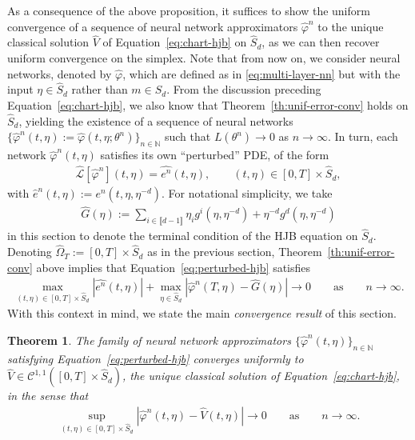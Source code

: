 \documentclass[11pt,reqno]{amsart}
\numberwithin{equation}{section}
\theoremstyle{plain}
\newtheorem{theorem}{Theorem}[section]
\newcommand{\sC}{\mathcal{C}}
\newcommand{\sL}{\mathcal{L}}
\newcommand{\N}{\mathbb{N}}
\newcommand{\lbrs}[1]{\llbracket #1 \rrbracket}
\begin{document}
As a consequence of the above proposition, it suffices to show the uniform convergence of a sequence of neural network approximators $\widehat{\varphi}^n$ to the unique classical solution $\widehat{V}$ of Equation~\eqref{eq:chart-hjb} on $\widehat{S}_d$, as we can then recover uniform convergence on the simplex. Note that from now on, we consider neural networks, denoted by $\widehat{\varphi}$, which are defined as in \eqref{eq:multi-layer-nn} but with the input $\eta\in\widehat{S}_d$ rather than $m\in S_d$. From the discussion preceding Equation~\eqref{eq:chart-hjb}, we also know that Theorem~\ref{th:unif-error-conv} holds on $\widehat{S}_d$, yielding the existence of a sequence of neural networks $\{\widehat{\varphi}^n(t,\eta):=\widehat{\varphi}(t,\eta; \theta^n)\}_{n \in \N}$ such that
$L(\theta^n) \to 0$ as $n \to \infty$. In turn, each network $\widehat{\varphi}^n(t,\eta)$ satisfies its own ``perturbed'' PDE, of the form
\begin{align}
\label{eq:perturbed-hjb}
    \widehat{\sL}[\widehat{\varphi}^n](t, \eta) = \widehat{e^n}(t, \eta), \qquad (t,\eta) \in [0,T] \times \widehat{S}_d,
\end{align}
with $\widehat{e}^n(t, \eta):=e^n(t,\eta,\eta^{-d})$. 
For notational simplicity, we take
\begin{align*}
    \widehat{G}(\eta) := \sum_{i \in \lbrs{d-1}} \eta_i g^i(\eta, \eta^{-d}) + \eta^{-d}g^d(\eta, \eta^{-d})
\end{align*}
in this section to denote the terminal condition of the HJB equation on $\widehat{S}_d$. Denoting $\widehat{\Omega}_T := [0, T] \times \widehat{S}_d$ as in the previous section, Theorem~\ref{th:unif-error-conv} above implies that Equation~\eqref{eq:perturbed-hjb} satisfies
\begin{align*}
    \max_{(t,\eta) \in [0,T] \times \widehat{S}_d}\left|\widehat{e^n}(t,\eta)\right|+ \max_{\eta \in \widehat{S}_d}\left|\widehat{\varphi}^n(T, \eta) - \widehat{G}(\eta)\right| \to 0\qquad\text{as}\qquad n\to\infty.
\end{align*}
With this context in mind, we state the main {\it convergence result} of this section.
\begin{theorem}
\label{th:unif-value-conv}
The family of neural network approximators $\{\widehat{\varphi}^n(t, \eta)\}_{n \in \N}$ satisfying Equation~\eqref{eq:perturbed-hjb} converges uniformly to $\widehat{V} \in \sC^{1,1}([0,T] \times \widehat{S}_d)$, the unique classical solution of Equation~\eqref{eq:chart-hjb}, in the sense that
\begin{align*}
    \sup_{(t,\eta) \in [0,T] \times \widehat{S}_d} |\widehat{\varphi}^n(t, \eta) - \widehat{V}(t, \eta)| \to 0\qquad \text{as}\qquad n\to\infty.
\end{align*}
\end{theorem}
\end{document}
